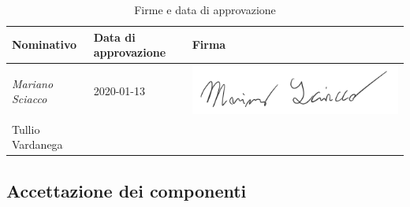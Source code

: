 			\begin{table}[!h]
				\centering
				\begin{tabular}{|l|l|l|}
					\hline
					\textbf{Nominativo} & \textbf{Data di approvazione} & \textbf{Firma} \\ \hline
					\textit{Mariano Sciacco} & 2020-01-13 &  \includegraphics[scale=0.6]{images/firme/mariano}  \\ \hline
					Tullio Vardanega &  & \\ \hline
				\end{tabular}
				\caption{Firme e data di approvazione}
			\end{table}
			
		\subsection{Accettazione dei componenti}
			
